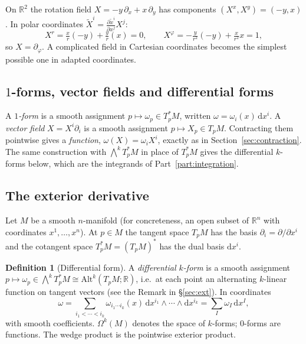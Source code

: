 \documentclass[11pt,a4paper]{article}
\newcounter{thm}[section]
\numberwithin{equation}{section}
\theoremstyle{definition}
\newtheorem{definition}[thm]{Definition}
\theoremstyle{plain}
\newcommand{\R}{\mathbb{R}}
\newcommand{\dd}{\mathrm{d}}
\newcommand{\Alt}{\mathrm{Alt}}                    %
\begin{document}
\begin{example}
On $\R^2$ the rotation field $X=-y\,\partial_x+x\,\partial_y$ has components $(X^x,X^y)=(-y,x)$. In polar coordinates $\tilde X^i=\frac{\partial\tilde x^i}{\partial x^j}X^j$:
\[
X^r=\tfrac{x}{r}(-y)+\tfrac{y}{r}(x)=0,\qquad X^\varphi=-\tfrac{y}{r^2}(-y)+\tfrac{x}{r^2}x=1,
\]
so $X=\partial_\varphi$. A complicated field in Cartesian coordinates becomes the simplest possible one in adapted coordinates.
\end{example}


\subsection{$1$-forms, vector fields and differential forms}\label{sec:oneforms}

A \emph{$1$-form} is a smooth assignment $p\mapsto\omega_p\in T^*_pM$, written $\omega=\omega_i(x)\,\dd x^i$. A \emph{vector field} $X=X^i\partial_i$ is a smooth assignment $p\mapsto X_p\in T_pM$. Contracting them pointwise gives a \emph{function},
$\omega(X)=\omega_iX^i$, exactly as in Section~\ref{sec:contraction}. The same construction with $\bigwedge^kT_p^*M$ in place of $T_p^*M$ gives the differential $k$-forms below, which are the integrands of Part~\ref{part:integration}.

\subsection{The exterior derivative}\label{sec:dform}
Let $M$ be a smooth $n$-manifold (for concreteness, an open subset of $\R^n$ with coordinates $x^1,\dots,x^n$). At $p\in M$ the tangent space $T_pM$ has the basis $\partial_i=\partial/\partial x^i$ and the cotangent space $T_p^*M=(T_pM)^*$ has the dual basis $\dd x^i$.

\begin{definition}[Differential form]
A \emph{differential $k$-form} is a smooth assignment $p\mapsto\omega_p\in\bigwedge^kT_p^*M\cong\Alt^k(T_pM;\R)$, i.e.\ at each point an alternating $k$-linear function on tangent vectors (see the Remark in \S\ref{sec:ext}). In coordinates
\[
 \omega=\sum_{i_1<\cdots<i_k}\omega_{i_1\cdots i_k}(x)\,\dd x^{i_1}\wedge\cdots\wedge\dd x^{i_k}=\sum_I\omega_I\,\dd x^I,
\]
with smooth coefficients. $\Omega^k(M)$ denotes the space of $k$-forms; $0$-forms are functions. The wedge product is the pointwise exterior product.
\end{definition}
\end{document}
